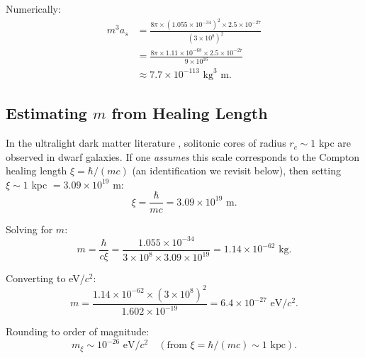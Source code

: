 \documentclass[11pt,a4paper]{article}
\theoremstyle{definition}
\theoremstyle{remark}
\begin{document}
Numerically:
\begin{align}
m^3 a_s &= \frac{8\pi \times (1.055 \times 10^{-34})^2 \times 2.5 \times 10^{-27}}{(3 \times 10^8)^2} \nonumber \\
&= \frac{8\pi \times 1.11 \times 10^{-68} \times 2.5 \times 10^{-27}}{9 \times 10^{16}} \nonumber \\
&\approx 7.7 \times 10^{-113} \text{ kg}^3 \text{ m}.
\end{align}

\subsection{Estimating $m$ from Healing Length}
\label{sec:estimate_m}

In the ultralight dark matter literature \cite{Hu2000,Schive2014}, solitonic cores of radius $r_c \sim 1$ kpc are observed in dwarf galaxies. If one \emph{assumes} this scale corresponds to the Compton healing length $\xi = \hbar/(mc)$ (an identification we revisit below), then setting $\xi \sim 1$ kpc $= 3.09 \times 10^{19}$ m:
\begin{equation}
\xi = \frac{\hbar}{mc} = 3.09 \times 10^{19} \text{ m}.
\end{equation}

Solving for $m$:
\begin{equation}
m = \frac{\hbar}{c\xi} = \frac{1.055 \times 10^{-34}}{3 \times 10^8 \times 3.09 \times 10^{19}} = 1.14 \times 10^{-62} \text{ kg}.
\end{equation}

Converting to eV/$c^2$:
\begin{equation}
m = \frac{1.14 \times 10^{-62} \times (3 \times 10^8)^2}{1.602 \times 10^{-19}} = 6.4 \times 10^{-27} \text{ eV}/c^2.
\end{equation}

Rounding to order of magnitude:
\begin{equation}
\boxed{m_{\xi} \sim 10^{-26} \text{ eV}/c^2 \quad (\text{from } \xi = \hbar/(mc) \sim 1 \text{ kpc}).}
\end{equation}
\end{document}
